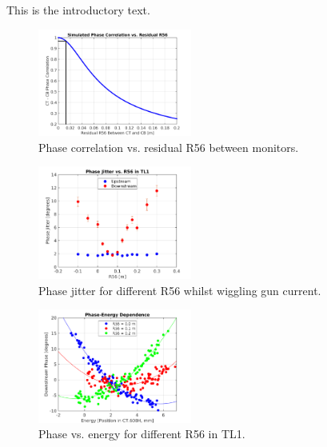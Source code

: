
This is the introductory text.



\begin{figure}
  \centering
  \includegraphics[width=0.45\textwidth]{Figures/R56_corrSim}
  \caption{Phase correlation vs. residual R56 between monitors.}
  \label{f:R56_corrSim}
\end{figure}


\begin{figure}
  \centering
  \includegraphics[width=0.45\textwidth]{Figures/R56ScanGunWiggle_PhaseJitter}
  \caption{Phase jitter for different R56 whilst wiggling gun current.}
  \label{f:R56ScanGunWiggle_PhaseJitter}
\end{figure}

\begin{figure}
  \centering
  \includegraphics[width=0.45\textwidth]{Figures/R56ScanGunWiggle_Vs608}
  \caption{Phase vs. energy for different R56 in TL1.}
  \label{f:R56ScanGunWiggle_Vs608}
\end{figure}










